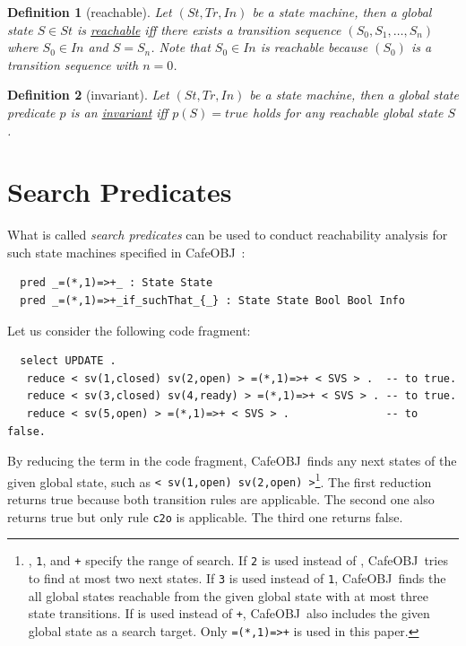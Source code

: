 \documentclass[12pt]{report}
\newtheorem{definition}{Definition}
\newcommand{\stt}[1]{{\small{\tt {#1}}}}
\newcommand{\ul}{\underline}
\newcommand{\cafeobj}{{\sf CafeOBJ}~}
\begin{document}
\begin{definition}[reachable]
  Let $(\mathit{St},\mathit{Tr},In)$ be a state machine, then a global state $S\in \mathit{St}$
  is \ul{reachable} iff there exists a transition sequence
  $(\mathit{S_0},\mathit{S_1},\dots,\mathit{S_n})$ where $\mathit{S_0}\in In$ and $S=\mathit{S_n}$. Note that $\mathit{S_0}\in
  In$ is reachable because $(\mathit{S_0})$ is a transition sequence with $n=0$.
\end{definition}
\begin{definition}[invariant]
  Let $(\mathit{St},\mathit{Tr},In)$ be a state machine, then a global state predicate
  $p$ is an \ul{invariant} iff $p(S)=true$ holds for any reachable
  global state $S$\!.
\end{definition}

\section{Search Predicates}
\label{sec:searchpredicate}
What is called {\it search predicates} can be used to conduct
reachability analysis for such state machines specified in
\cafeobj:
\small
\begin{verbatim}
  pred _=(*,1)=>+_ : State State
  pred _=(*,1)=>+_if_suchThat_{_} : State State Bool Bool Info
\end{verbatim}
\normalsize

Let us consider the following code fragment:
\small
\begin{verbatim}
  select UPDATE .
   reduce < sv(1,closed) sv(2,open) > =(*,1)=>+ < SVS > .  -- to true.
   reduce < sv(3,closed) sv(4,ready) > =(*,1)=>+ < SVS > . -- to true.
   reduce < sv(5,open) > =(*,1)=>+ < SVS > .               -- to false.
\end{verbatim}
\normalsize
By reducing the term in the code fragment, \cafeobj finds any next
states of the given global state, such as
\stt{<~sv(1,open)~sv(2,open)~>}\footnote{{\tt *}, {\tt 1}, and {\tt +}
  specify the range of search. If {\tt 2} is used instead of {\tt *},
  \cafeobj tries to find at most two next states. If {\tt 3} is used
  instead of {\tt 1}, \cafeobj finds the all global states reachable from the
  given global state with at most three state transitions. If {\tt *} is used
  instead of {\tt +}, \cafeobj also includes the given global state as a
  search target.  Only \stt{=(*,1)=>+} is used in this paper.}.  The
first reduction returns true because both transition rules are
applicable.  The second one also returns true but only rule {\tt c2o}
is applicable. The third one returns false.
\end{document}
